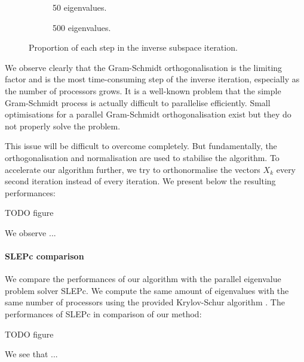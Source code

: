 \begin{figure}[H]
  \centering
  \begin{subfigure}[b]{0.4\textwidth}
   
   \caption{50 eigenvalues.}
  \end{subfigure}
  \begin{subfigure}[b]{0.4\textwidth}
   
   \caption{500 eigenvalues.}
  \end{subfigure}
  \caption{Proportion of each step in the inverse subspace iteration.}
\end{figure}

We observe clearly that the Gram-Schmidt orthogonalisation is the limiting factor and is the most time-consuming step of the inverse iteration, especially as the number of processors grows.
It is a well-known problem that the simple Gram-Schmidt process is actually difficult to parallelise efficiently.
Small optimisations for a parallel Gram-Schmidt orthogonalisation exist \cite{katagiri_parallel_gram_schmidt_2003} but they do not properly solve the problem.

This issue will be difficult to overcome completely.
But fundamentally, the orthogonalisation and normalisation are used to stabilise the algorithm.
To accelerate our algorithm further, we try to orthonormalise the vectors \(X_k\) every second iteration instead of every iteration.
We present below the resulting performances:

TODO figure
%  

We observe ...

\paragraph{SLEPc comparison}
We compare the performances of our algorithm with the parallel eigenvalue problem solver SLEPc.
We compute the same amount of eigenvalues with the same number of processors using the provided Krylov-Schur algorithm \cite{stewart_krylovschur_2002}.
The performances of SLEPc in comparison of our method:

TODO figure
%  

We see that ...
